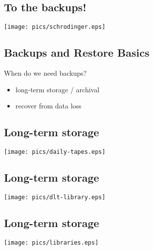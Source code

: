 \documentclass[xga]{xdvislides}
\begin{document}
\subsection{To the backups!}
\vspace*{\fill}
\begin{center}
	\texttt{[image: pics/schrodinger.eps]}
\end{center}
\vspace*{\fill}

\subsection{Backups and Restore Basics}
When do we need backups?
\begin{itemize}
	\item long-term storage / archival
	\item recover from data loss
\end{itemize}

\subsection{Long-term storage}
\vspace*{\fill}
\begin{center}
	\texttt{[image: pics/daily-tapes.eps]}
\end{center}
\vspace*{\fill}

\subsection{Long-term storage}
\vspace*{\fill}
\begin{center}
	\texttt{[image: pics/dlt-library.eps]}
\end{center}
\vspace*{\fill}

\subsection{Long-term storage}
\vspace*{\fill}
\begin{center}
	\texttt{[image: pics/libraries.eps]}
\end{center}
\vspace*{\fill}
\end{document}
